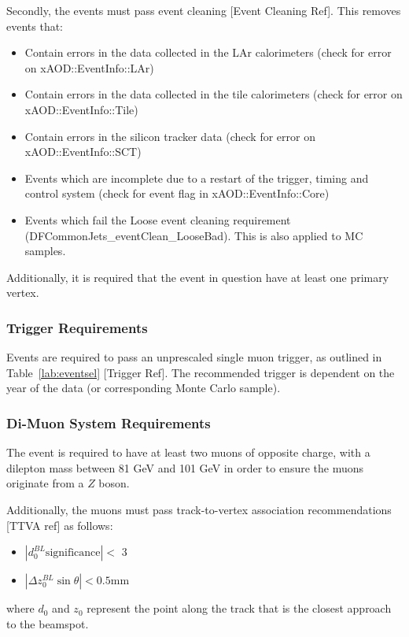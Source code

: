 Secondly, the events must pass event cleaning [Event Cleaning Ref]. This removes events that:
\begin{itemize}
    \item Contain errors in the data collected in the LAr calorimeters (check for error on xAOD::EventInfo::LAr)
    \item Contain errors in the data collected in the tile calorimeters (check for error on xAOD::EventInfo::Tile)
    \item Contain errors in the silicon tracker data (check for error on xAOD::EventInfo::SCT)
    \item Events which are incomplete due to a restart of the trigger, timing and control system (check for event flag in xAOD::EventInfo::Core)
    \item Events which fail the Loose event cleaning requirement (DFCommonJets\_eventClean\_LooseBad). This is also applied to MC samples.
\end{itemize}

Additionally, it is required that the event in question have at least one primary vertex.

\subsubsection{Trigger Requirements}
\label{subsubsec:trigger}
Events are required to pass an unprescaled single muon trigger, as outlined in Table~\ref{lab:eventsel} [Trigger Ref]. The recommended trigger is dependent on the year of the data (or corresponding Monte Carlo sample).

\subsubsection{Di-Muon System Requirements}
The event is required to have at least two muons of opposite charge, with a dilepton mass between 81 GeV and 101 GeV in order to ensure the muons originate from a $Z$ boson.

Additionally, the muons must pass track-to-vertex association recommendations [TTVA ref] as follows:

\begin{itemize}
    \item $|d_0^{BL}\text{significance}| < $ 3
    \item $|\Delta z_0^{BL}\sin\theta| < 0.5 $mm
\end{itemize}

where $d_0$ and $z_0$ represent the point along the track that is the closest approach to the beamspot.

